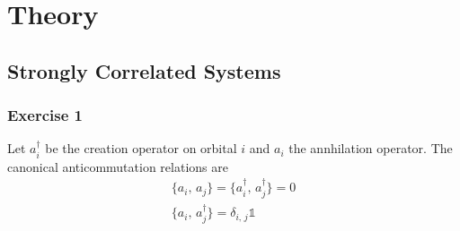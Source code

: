 \chapter{Theory}

\section{Strongly Correlated Systems}
\subsection{Exercise 1}
Let $a_i^\dagger$ be the creation operator on orbital $i$ and $a_i$ the annhilation operator. The canonical anticommutation relations are
\begin{align}
    \{a_i,\, a_j\} = \{a_i^\dagger,\, a_j^\dagger\} = 0 \\
    \{a_i,\, a_j^\dagger\} = \delta_{i,\, j} \mathds{1}
\end{align}